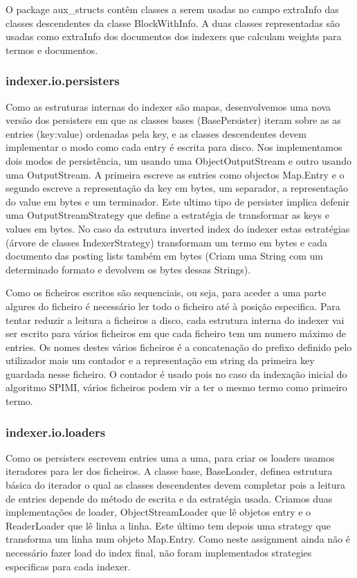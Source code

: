 \documentclass[12pt]{article}
\begin{document}
O package aux\_structs contêm classes a serem usadas no campo
extraInfo das classes descendentes da classe BlockWithInfo. A
duas classes representadas são usadas como extraInfo dos documentos
dos indexers que calculam weights para termos e documentos.

\subsubsection{indexer.io.persisters}

Como as estruturas internas do indexer são mapas, desenvolvemos uma
nova versão dos persisters em que as classes bases (BasePersister)
iteram sobre as as entries (key:value) ordenadas pela key, e as
classes descendentes devem implementar o modo como cada entry é
escrita para disco. Nos implementamos dois modos de persistência,
um usando uma ObjectOutputStream e outro usando uma OutputStream.
A primeira escreve as entries como objectos Map.Entry e o segundo
escreve a representação da key em bytes, um separador, a
representação do value em bytes e um terminador. Este ultimo tipo
de persister implica defenir uma OutputStreamStrategy que define
a estratégia de transformar as keys e values em bytes. No caso da
estrutura inverted index do indexer estas estratégias (árvore de
classes IndexerStrategy) transformam um termo em bytes e cada
documento das posting lists também em bytes (Criam uma String
com um determinado formato e devolvem os bytes dessas Strings).

Como os ficheiros escritos são sequenciais, ou seja, para aceder
a uma parte algures do ficheiro é necessário ler todo o ficheiro
até à posição especifica. Para tentar reduzir a leitura a ficheiros
a disco, cada estrutura interna do indexer vai ser escrito para
vários ficheiros em que cada ficheiro tem um numero máximo de
entries. Os nomes destes vários ficheiros é a concatenação do
prefixo definido pelo utilizador mais um contador e a representação
em string da primeira key guardada nesse ficheiro. O contador é
usado pois no caso da indexação inicial do algoritmo SPIMI, vários
ficheiros podem vir a ter o mesmo termo como primeiro termo.

\subsubsection{indexer.io.loaders}

Como os persisters escrevem entries uma a uma, para criar os loaders
usamos iteradores para ler dos ficheiros. A classe base, BaseLoader,
definea estrutura básica do iterador o qual as classes descendentes
devem completar pois a leitura de entries depende do método de
escrita e da estratégia usada. Criamos duas implementações de
loader, ObjectStreamLoader que lê objetos entry e o ReaderLoader que
lê linha a linha. Este último tem depois uma strategy que transforma
um linha num objeto Map.Entry. Como neste assignment ainda não é
necessário fazer load do index final, não foram implementados
strategies especificas para cada indexer.
\end{document}
